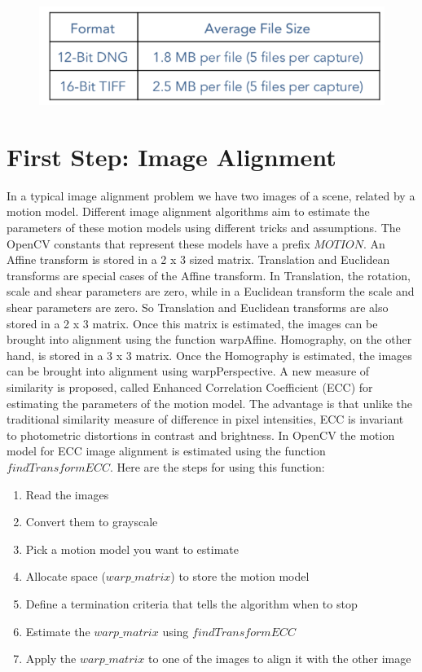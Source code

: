 \documentclass[a4paper,11pt,oneside]{book}
\begin{document}
\begin{figure}[H]
	\centering
	\includegraphics[width=8 cm]{micasense2.png}
	
\end{figure}

\section*{First Step: Image Alignment}
In a typical image alignment problem we have two images of a scene, related by a motion model. Different image alignment algorithms aim to estimate the parameters of these motion models using different tricks and assumptions.
The OpenCV constants that represent these models have a prefix $MOTION$.
An Affine transform is stored in a 2 x 3 sized matrix. Translation and Euclidean transforms are special cases of the Affine transform. In Translation, the rotation, scale and shear parameters are zero, while in a Euclidean transform the scale and shear parameters are zero. So Translation and Euclidean transforms are also stored in a 2 x 3 matrix. Once this matrix is estimated, the images can be brought into alignment using the function warpAffine.
Homography, on the other hand, is stored in a 3 x 3 matrix. Once the Homography is estimated, the images can be brought into alignment using warpPerspective.
A new measure of similarity is proposed, called Enhanced Correlation Coefficient (ECC) for estimating the parameters of the motion model. The advantage is that unlike the traditional similarity measure of difference in pixel intensities, ECC is invariant to photometric distortions in contrast and brightness.
In OpenCV the motion model for ECC image alignment is estimated using the function $findTransformECC$.
Here are the steps for using this function:
\begin{enumerate}
\item Read the images
\item Convert them to grayscale
\item Pick a motion model you want to estimate
\item Allocate space ($warp\_matrix$) to store the motion model
\item Define a termination criteria that tells the algorithm when to stop
\item Estimate the $warp\_matrix$ using $findTransformECC$
\item Apply the $warp\_matrix$ to one of the images to align it with the other image
\end{enumerate}
\end{document}
